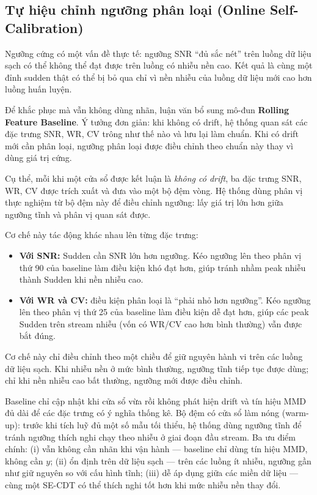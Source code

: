 \subsection{Tự hiệu chỉnh ngưỡng phân loại (Online Self-Calibration)}
\label{sec:se-cdt-self-calibration}

Ngưỡng cứng có một vấn đề thực tế: ngưỡng SNR ``đủ sắc nét'' trên luồng dữ liệu sạch có thể không thể đạt được trên luồng có nhiễu nền cao. Kết quả là cùng một đỉnh sudden thật có thể bị bỏ qua chỉ vì nền nhiễu của luồng dữ liệu mới cao hơn luồng huấn luyện.

Để khắc phục mà vẫn không dùng nhãn, luận văn bổ sung mô-đun \textbf{Rolling Feature Baseline}. Ý tưởng đơn giản: khi không có drift, hệ thống quan sát các đặc trưng SNR, WR, CV trông như thế nào và lưu lại làm chuẩn. Khi có drift mới cần phân loại, ngưỡng phân loại được điều chỉnh theo chuẩn này thay vì dùng giá trị cứng.

Cụ thể, mỗi khi một cửa sổ được kết luận là \textit{không có drift}, ba đặc trưng SNR, WR, CV được trích xuất và đưa vào một bộ đệm vòng. Hệ thống dùng phân vị thực nghiệm từ bộ đệm này để điều chỉnh ngưỡng: lấy giá trị lớn hơn giữa ngưỡng tĩnh và phân vị quan sát được.

Cơ chế này tác động khác nhau lên từng đặc trưng:
\begin{itemize}
	\item \textbf{Với SNR:} Sudden cần $\text{SNR}$ lớn hơn ngưỡng. Kéo ngưỡng lên theo phân vị thứ 90 của baseline làm điều kiện khó đạt hơn, giúp tránh nhầm peak nhiễu thành Sudden khi nền nhiễu cao.
	\item \textbf{Với WR và CV:} điều kiện phân loại là ``phải nhỏ hơn ngưỡng''. Kéo ngưỡng lên theo phân vị thứ 25 của baseline làm điều kiện dễ đạt hơn, giúp các peak Sudden trên stream nhiễu (vốn có WR/CV cao hơn bình thường) vẫn được bắt đúng.
\end{itemize}
Cơ chế này chỉ điều chỉnh theo một chiều để giữ nguyên hành vi trên các luồng dữ liệu sạch. Khi nhiễu nền ở mức bình thường, ngưỡng tĩnh tiếp tục được dùng; chỉ khi nền nhiễu cao bất thường, ngưỡng mới được điều chỉnh.

Baseline chỉ cập nhật khi cửa sổ vừa rồi không phát hiện drift và tín hiệu MMD đủ dài để các đặc trưng có ý nghĩa thống kê. Bộ đệm có cửa sổ làm nóng (warm-up): trước khi tích luỹ đủ một số mẫu tối thiểu, hệ thống dùng ngưỡng tĩnh để tránh ngưỡng thích nghi chạy theo nhiễu ở giai đoạn đầu stream. Ba ưu điểm chính: (i) vẫn không cần nhãn khi vận hành --- baseline chỉ dùng tín hiệu MMD, không cần $y$; (ii) ổn định trên dữ liệu sạch --- trên các luồng ít nhiễu, ngưỡng gần như giữ nguyên so với cấu hình tĩnh; (iii) dễ áp dụng giữa các miền dữ liệu --- cùng một SE-CDT có thể thích nghi tốt hơn khi mức nhiễu nền thay đổi.


